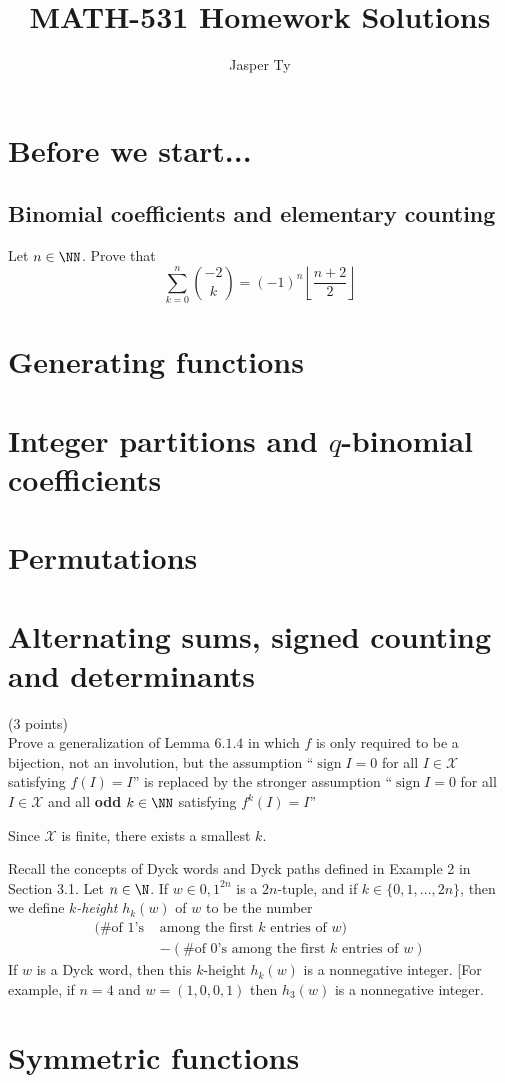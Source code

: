 \documentclass{article}
\title{MATH-531 Homework Solutions}
\author{Jasper Ty}
\date{}
\DeclareMathOperator{\sign}{sign}
\newcommand{\pts}[1]{\fbox{#1}}
\begin{document}
\maketitle

\section{Before we start...}

\subsection{Binomial coefficients and elementary counting}

\begin{exercise}\pts{3} Let $n \in \NN$. Prove that 
    \[
        \sum_{k=0}^n \binom{-2}{k} = (-1)^n \left\lfloor\frac{n+2}{2}\right\rfloor
    \]
\end{exercise}

\section{Generating functions}
\section{Integer partitions and \texorpdfstring{$q$}{q}-binomial coefficients}
\section{Permutations}
\section{Alternating sums, signed counting and determinants}

\begin{exercise} ($3$ points) \\
    Prove a generalization of Lemma $6.1.4$ in which $f$ is only required to be a bijection, not an involution, but the assumption ``$\sign I = 0$ for all $I \in \mathcal{X}$ satisfying $f(I) = I$'' is replaced by the stronger assumption  ``$\sign I = 0$ for all $I \in \mathcal{X}$ and all \textbf{odd} $k \in \NN$ satisfying $f^k(I) = I$''
\end{exercise}

Since $\mathcal{X}$ is finite, there exists a smallest $k$.

\begin{exercise}
    Recall the concepts of Dyck words and Dyck paths defined in Example 2 in Section 3.1.
    Let $n \in \N$.
    If $w \in {0,1}^{2n}$ is a $2n$-tuple, and if $k \in \{0,1,\ldots,2n\}$, then we define \textit{$k$-height} $h_k(w)$ of $w$ to be the number 
    \begin{align*}
        (\text{\# of $1$'s }&\text{among the first $k$ entries of $w$}) \\
        &- (\text{\# of $0$'s among the first $k$ entries of $w$}) 
    \end{align*}
    If $w$ is a Dyck word, then this $k$-height $h_k(w)$ is a nonnegative integer.
    [For example, if $n=4$ and $w=(1,0,0,1)$ then $h_3(w)$ is a nonnegative integer.
\end{exercise}

\section{Symmetric functions}
\end{document}
